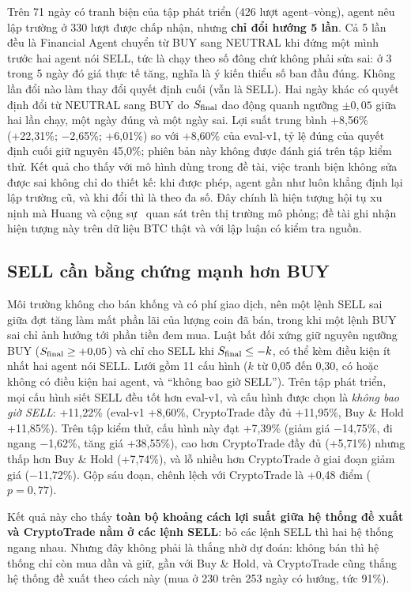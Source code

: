 Trên 71 ngày có tranh biện của tập phát triển (426 lượt agent--vòng), agent nêu lập trường ở 330 lượt được chấp nhận,
nhưng \textbf{chỉ đổi hướng 5 lần}. Cả 5 lần đều là Financial Agent chuyển từ BUY sang NEUTRAL khi đứng một mình trước
hai agent nói SELL, tức là chạy theo số đông chứ không phải sửa sai: ở 3 trong 5 ngày đó giá thực tế tăng, nghĩa là ý
kiến thiểu số ban đầu đúng. Không lần đổi nào làm thay đổi quyết định cuối (vẫn là SELL). Hai ngày khác có quyết định
đổi từ NEUTRAL sang BUY do $S_{\text{final}}$ dao động quanh ngưỡng $\pm0{,}05$ giữa hai lần chạy, một ngày đúng và một ngày sai.
Lợi suất trung bình +8,56\% (+22,31\%; $-$2,65\%; +6,01\%) so với +8,60\% của eval-v1, tỷ lệ đúng của quyết định cuối
giữ nguyên 45,0\%; phiên bản này không được đánh giá trên tập kiểm thử. Kết quả cho thấy với mô hình dùng trong đề tài,
việc tranh biện không sửa được sai không chỉ do thiết kế: khi được phép, agent gần như luôn khẳng định lại lập trường cũ,
và khi đổi thì là theo đa số. Đây chính là hiện tượng hội tụ xu nịnh mà Huang và cộng sự~\cite{huang2026debate} quan
sát trên thị trường mô phỏng; đề tài ghi nhận hiện tượng này trên dữ liệu BTC thật và với lập luận có kiểm tra nguồn.

\subsection{SELL cần bằng chứng mạnh hơn BUY}
\label{sec:sell-rule}
Môi trường không cho bán khống và có phí giao dịch, nên một lệnh SELL sai giữa đợt tăng làm mất phần lãi của lượng coin
đã bán, trong khi một lệnh BUY sai chỉ ảnh hưởng tới phần tiền đem mua. Luật bất đối xứng giữ nguyên ngưỡng BUY
($S_{\text{final}}\ge+0{,}05$) và chỉ cho SELL khi $S_{\text{final}}\le-k$, có thể kèm điều kiện ít nhất hai agent nói SELL. Lưới gồm 11
cấu hình ($k$ từ 0,05 đến 0,30, có hoặc không có điều kiện hai agent, và ``không bao giờ SELL''). Trên tập phát triển,
mọi cấu hình siết SELL đều tốt hơn eval-v1, và cấu hình được chọn là \emph{không bao giờ SELL}: +11,22\% (eval-v1
+8,60\%, CryptoTrade đầy đủ +11,95\%, Buy \& Hold +11,85\%). Trên tập kiểm thử, cấu hình này đạt +7,39\% (giảm giá
$-$14,75\%, đi ngang $-$1,62\%, tăng giá +38,55\%), cao hơn CryptoTrade đầy đủ (+5,71\%) nhưng thấp hơn Buy \& Hold
(+7,74\%), và lỗ nhiều hơn CryptoTrade ở giai đoạn giảm giá ($-$11,72\%). Gộp sáu đoạn, chênh lệch với CryptoTrade là
+0,48 điểm ($p=0{,}77$).

Kết quả này cho thấy \textbf{toàn bộ khoảng cách lợi suất giữa hệ thống đề xuất và CryptoTrade nằm ở các lệnh SELL}:
bỏ các lệnh SELL thì hai hệ thống ngang nhau. Nhưng đây không phải là thắng nhờ dự đoán: không bán thì hệ thống chỉ còn
mua dần và giữ, gần với Buy \& Hold, và CryptoTrade cũng thắng hệ thống đề xuất theo cách này (mua ở 230 trên 253 ngày
có hướng, tức 91\%).

